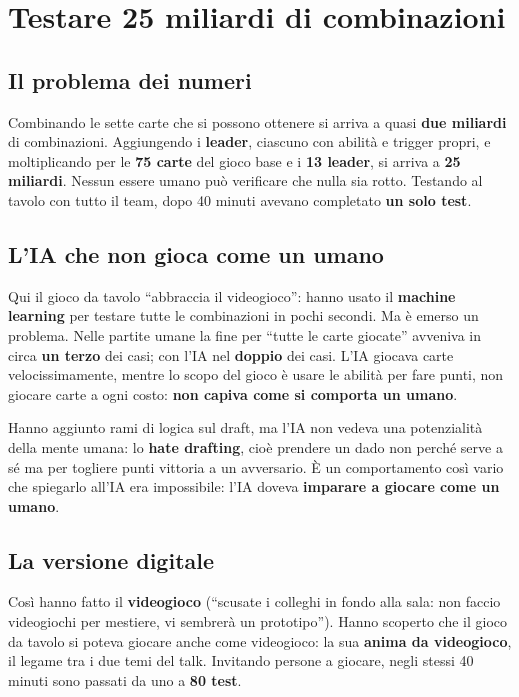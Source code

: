 \section{Testare 25 miliardi di combinazioni}
\label{sec:c3-5-test}

\subsection{Il problema dei numeri}

Combinando le sette carte che si possono ottenere si arriva a quasi \textbf{due
miliardi} di combinazioni. Aggiungendo i \textbf{leader}, ciascuno con abilità e
trigger propri, e moltiplicando per le \textbf{75 carte} del gioco base e i
\textbf{13 leader}, si arriva a \textbf{25 miliardi}. Nessun essere umano può
verificare che nulla sia rotto. Testando al tavolo con tutto il team, dopo 40 minuti
avevano completato \textbf{un solo test}.

\subsection{L'IA che non gioca come un umano}

Qui il gioco da tavolo ``abbraccia il videogioco'': hanno usato il
\textbf{machine learning} per testare tutte le combinazioni in pochi secondi. Ma è
emerso un problema. Nelle partite umane la fine per ``tutte le carte giocate''
avveniva in circa \textbf{un terzo} dei casi; con l'IA nel \textbf{doppio} dei casi.
L'IA giocava carte velocissimamente, mentre lo scopo del gioco è usare le abilità
per fare punti, non giocare carte a ogni costo: \textbf{non capiva come si comporta
un umano}.

Hanno aggiunto rami di logica sul draft, ma l'IA non vedeva una potenzialità della
mente umana: lo \textbf{hate drafting}, cioè prendere un dado non perché serve a sé
ma per togliere punti vittoria a un avversario. È un comportamento così vario che
spiegarlo all'IA era impossibile: l'IA doveva \textbf{imparare a giocare come un
umano}.

\subsection{La versione digitale}

Così hanno fatto il \textbf{videogioco} (``scusate i colleghi in fondo alla sala: non
faccio videogiochi per mestiere, vi sembrerà un prototipo''). Hanno scoperto che il
gioco da tavolo si poteva giocare anche come videogioco: la sua \textbf{anima da
videogioco}, il legame tra i due temi del talk. Invitando persone a giocare, negli
stessi 40 minuti sono passati da uno a \textbf{80 test}.

